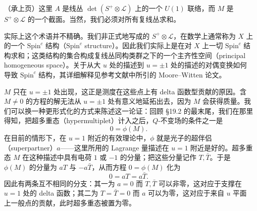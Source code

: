 
（承上页）这里 $A$ 是线丛 $\det(S^+\otimes\mathcal{L})$ 上的一个 $U(1)$ 联络，而 $M$ 是 $S^+\otimes\mathcal{L}$ 的一个截面。当然，我们必须对所有复线丛求和。

实际上这个术语并不精确。我们非正式地写成的 $S^+\otimes\mathcal{L}$，在数学上通常称为 $X$ 上的一个 $\mathrm{Spin}^c$ 结构（$\mathrm{Spin}^c$ structure）。因此我们实际上是在对 $X$ 上一切 $\mathrm{Spin}^c$ 结构求和；这类结构的集合构成复线丛同构类群之下的一个主齐性空间（principal homogeneous space）。关于从大 $u$ 处的描述到 $u=\pm1$ 处的描述的对偶变换如何导致 $\mathrm{Spin}^c$ 结构，其详细解释见参考文献中所引的 Moore--Witten 论文。


$M$ 只在 $u=\pm1$ 处出现，这正是测度在这些点上有 delta 函数型贡献的原因。含 $M\ne0$ 的方程的解无法从 $u=\pm1$ 处有意义地延拓出去，因为 $M$ 会获得质量。我们可以换一种更形式化的方式来陈述这一论证：回顾 §19.2 的最末尾，我们在那里得知，把超多重态（hypermultiplet）计入之后，$Q$-不变场的条件之一是
\[
0=\phi(M).
\]
在目前的情形下，在 $u=1$ 附近的有效理论中，$\phi$ 就是光子的超伴侣（superpartner）$a$——这里所用的 Lagrange 量描述在 $u=1$ 附近是好的。超多重态 $M$ 在这种描述中具有电荷 $1$ 或 $-1$ 的分量；把这些分量记作 $T,\bar T$。于是 $\phi(M)$ 的分量为 $aT$ 与 $-a\bar T$，从而方程 $0=\phi(M)$ 化为
\[
0=aT=a\bar T.
\]
因此有两条互不相同的分支：其一为 $a=0$ 而 $T,\bar T$ 可以非零，这对应于支撑在 $u=1$ 处的 delta 函数；其二为 $T=\bar T=0$ 而 $a$ 可以为零，这对应于来自 $u$ 平面上一般点的贡献，此时超多重态被置为零。

